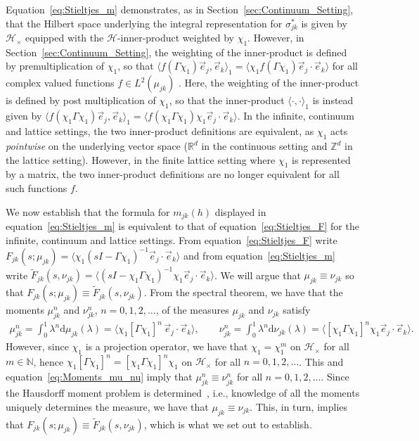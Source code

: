 \documentclass{cmslatex}
\renewcommand{\d}{\text{d}}
\begin{document}
Equation~\eqref{eq:Stieltjes_m} demonstrates, as in
Section~\ref{sec:Continuum_Setting}, that the Hilbert space underlying the
integral representation for $\sigma^*_{jk}$ is given by $\mathscr{H}_\times$
equipped with the $\mathscr{H}$-inner-product weighted by $\chi_1$. However, in
Section~\ref{sec:Continuum_Setting}, the 
weighting of the inner-product is defined by premultiplication of
$\chi_1$, so that $\langle f(\Gamma\chi_1)\vec{e}_j,\vec{e}_k\rangle_1=\langle\chi_1f(\Gamma\chi_1)\vec{e}_j\cdot\vec{e}_k\rangle$ for
all complex valued functions $f\in L^2(\mu_{jk})$ \cite{Stone:64}. Here,
the weighting of the inner-product is defined by post multiplication
of $\chi_1$, so that the inner-product $\langle\cdot,\cdot\rangle_1$ is instead given by
$\langle f(\chi_1\Gamma\chi_1)\vec{e}_j,\vec{e}_k\rangle_1=\langle f(\chi_1\Gamma\chi_1)\chi_1\vec{e}_j\cdot\vec{e}_k\rangle$. In
the infinite, continuum and lattice settings, the two inner-product
definitions are equivalent, as $\chi_1$ acts \emph{pointwise} on the
underlying vector space ($\mathbb{R}^d$ in the continuous setting and
$\mathbb{Z}^d$ in the lattice setting). However, in the finite lattice
setting where $\chi_1$ is represented by a matrix, the two inner-product definitions are no
longer equivalent for all such functions $f$. 



We now establish that the formula for $m_{jk}(h)$ displayed in
equation~\eqref{eq:Stieltjes_m} is equivalent to that of
equation~\eqref{eq:Stieltjes_F} for the infinite, continuum and
lattice settings. From equation~\eqref{eq:Stieltjes_F} write 
$F_{jk}(s;\mu_{jk})=\langle\chi_1(sI-\Gamma\chi_1)^{-1}\vec{e}_j\cdot\vec{e}_k\rangle$ and from
equation~\eqref{eq:Stieltjes_m} write 
$\tilde{F}_{jk}(s,\nu_{jk})=\langle(sI-\chi_1\Gamma\chi_1)^{-1}\chi_1\vec{e}_j\cdot\vec{e}_k\rangle$. We will
argue that $\mu_{jk}\equiv\nu_{jk}$ so that
$F_{jk}(s;\mu_{jk})\equiv\tilde{F}_{jk}(s,\nu_{jk})$. From the spectral
theorem, we have that the moments $\mu^n_{jk}$ and $\nu^n_{jk}$,
$n=0,1,2,\ldots$, of the measures $\mu_{jk}$ and $\nu_{jk}$ satisfy 
%
\begin{align}\label{eq:Moments_mu_nu}
   \mu_{jk}^n=\int_0^1\lambda^n\d\mu_{jk}(\lambda)=\langle\chi_1[\Gamma\chi_1]^n\,\vec{e}_j\cdot\vec{e}_k\rangle, \qquad
   \nu_{jk}^n=\int_0^1\lambda^n\d\nu_{jk}(\lambda)=\langle[\chi_1\Gamma\chi_1]^n\chi_1\vec{e}_j\cdot\vec{e}_k\rangle.
\end{align}
%
However, since $\chi_1$ is a projection operator, we have that
$\chi_1=\chi_1^m$ on $\mathscr{H}_\times$ for all $m\in\mathbb{N}$, hence
$\chi_1[\Gamma\chi_1]^n=[\chi_1\Gamma\chi_1]^n\chi_1$ on $\mathscr{H}_\times$ for all
$n=0,1,2,\ldots$. This and equation~\eqref{eq:Moments_mu_nu} imply that
$\mu^n_{jk}\equiv\nu^n_{jk}$  for all $n=0,1,2,\ldots$. Since the Hausdorff moment
problem is determined~\cite{Shohat:1963}, i.e., knowledge of all the
moments uniquely determines the measure, we have that
$\mu_{jk}\equiv\nu_{jk}$. This, in turn, implies that
$F_{jk}(s;\mu_{jk})\equiv\tilde{F}_{jk}(s,\nu_{jk})$, which is what we set out
to establish.
\end{document}
